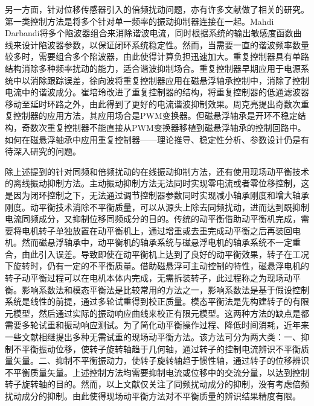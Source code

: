 \documentclass[
  lang=cn,
  degree=master,
  openany,oneside
]{nuaathesis}
\begin{document}
另一方面，针对位移传感器引入的倍频扰动问题，亦有许多文献做了相关的研究。第一类控制方法是将多个针对单一频率的振动抑制器连接在一起。Mahdi Darbandi将多个陷波器组合来消除谐波电流，同时根据系统的输出敏感度函数曲线来设计陷波器参数，以保证闭环系统稳定性\cite{mahdi2017harmonic}。然而，当需要一直的谐波频率数量较多时，需要组合多个陷波器，由此使得计算负担迅速加大。重复控制器具有单路结构消除多种频率扰动的能力，适合谐波抑制场合。重复控制器早期应用于电源系统中以消除跟踪误差\cite{zhou2008plug}，徐向波将重复控制器应用在磁悬浮轴承控制中，消除了控制电流中的谐波成分\cite{xu2015model}。崔培玲改进了重复控制器的结构，将重复控制器的低通滤波器移动至延时环路之外，由此得到了更好的电流谐波抑制效果\cite{cui2016suppression}。周克亮提出奇数次重复控制器的应用方法，其应用场合是PWM变换器\cite{zhou2006zero}。但磁悬浮轴承是开环不稳定结构，奇数次重复控制器不能直接从PWM变换器移植到磁悬浮轴承的控制回路中。如何在磁悬浮轴承中应用重复控制器——理论推导、稳定性分析、参数设计仍是有待深入研究的问题。

除上述提到的针对同频和倍频扰动的在线振动抑制方法，还有使用现场动平衡技术的离线振动抑制方法。主动振动抑制方法无法同时实现零电流或者零位移控制，这是因为闭环控制之下，无法通过调节控制器参数同时实现减小轴承刚度和增大轴承刚度。动平衡技术消除不平衡质量，可以从源头上除去同频扰动，进而达到既抑制电流同频成分，又抑制位移同频成分的目的。传统的动平衡借助动平衡机完成，需要将电机转子单独放置在动平衡机上，通过增重或去重完成动平衡之后再装回电机。然而磁悬浮轴承中，动平衡机的轴承系统与磁悬浮电机的轴承系统不一定重合，由此引入误差。导致即使在动平衡机上达到了良好的动平衡效果，转子在工况下旋转时，仍有一定的不平衡质量。借助磁悬浮可主动控制的特性，磁悬浮电机的转子动平衡过程可以在电机本体内完成，无需拆装转子，此过程称之为现场动平衡。影响系数法和模态平衡法是比较常用的方法之一，影响系数法是基于假设控制系统是线性的前提，通过多轮试重得到校正质量\cite{john2009relationship,ranjan2019application}。模态平衡法是先构建转子的有限元模型，然后通过实际的振动响应曲线来校正有限元模型。这两种方法的缺点是都需要多轮试重和振动响应测试\cite{wang2014field}。为了简化动平衡操作过程、降低时间消耗，近年来一些文献相继提出多种无需试重的现场动平衡方法。该方法可分为两大类：一、抑制不平衡振动位移，使转子旋转轴趋于几何轴，通过转子的控制电流辨识不平衡质量矢量\cite{fang2013field,liu2015field}。二、抑制不平衡振动力，使转子旋转轴趋于惯性轴，通过转子的位移辨识不平衡质量矢量\cite{xu2015field}。上述控制方法均需要抑制电流或位移中的交流分量，以达到控制转子旋转轴的目的。然而，以上文献仅关注了同频扰动成分的抑制，没有考虑倍频扰动成分的抑制。由此使得现场动平衡方法对不平衡质量的辨识结果精度有限。
\end{document}
